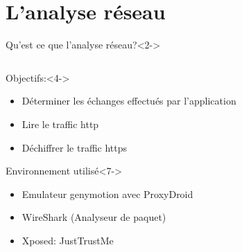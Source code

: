 \documentclass[aspectratio=1610, handout]{beamer}%
\begin{document}
 
\section{L'analyse réseau}
\begin{frame}[t]
  \slidetitle[]
  \begin{block}{Qu'est ce que l'analyse réseau?}<2->
    \end{block}
  \begin{columns}
    \begin{column}{0.7\linewidth}
      \begin{block}{Objectifs:}<4->
        \begin{itemize}
        \item<5-> Déterminer les échanges effectués par l'application
        \item<6-> Lire le traffic http
        \item<7-> Déchiffrer le traffic https
        \end{itemize}
      \end{block}
      \begin{block}{Environnement utilisé}<7->
        \begin{itemize}
          \item<8-> Emulateur genymotion avec ProxyDroid
          \item<9-> WireShark (Analyseur de paquet)
          \item<10-> Xposed: JustTrustMe
          \end{itemize}
      \end{block}    
    \end{column}
    \begin{column}{0.25\linewidth}
      \centering

\end{column}
\end{columns}
\end{frame}
\end{document}
